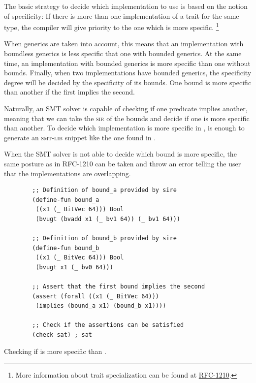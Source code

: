 The basic strategy to decide which implementation to use is based on the notion
of specificity: If there is more than one implementation of a trait for the
same type, the compiler will give priority to the one which is more specific.
\footnote{More information about trait specialization can be found at
\href{https://github.com/rust-lang/rfcs/blob/master/text/1210-impl-specialization.md}{RFC-1210}.}

When generics are taken into account, this means that an implementation with
boundless generics is less specific that one with bounded generics. At the same
time, an implementation with bounded generics is more specific than one without
bounds. Finally, when two implementations have bounded generics, the
specificity degree will be decided by the specificity of its bounds. One bound
is more specific than another if the first implies the second.

Naturally, an SMT solver is capable of checking if one predicate implies
another, meaning that we can take the \textsc{sir} of the bounds and decide if
one is more specific than another. To decide which implementation is more
specific in , is enough to generate an
\textsc{smt-lib} snippet like the one found in .

When the SMT solver is not able to decide which bound is more specific, the
same posture as in RFC-1210 can be taken and throw an error telling the user
that the implementations are overlapping.

\begin{listing}[h]
	\begin{verbatim}
        ;; Definition of bound_a provided by sire
        (define-fun bound_a
         ((x1 (_ BitVec 64))) Bool 
         (bvugt (bvadd x1 (_ bv1 64)) (_ bv1 64)))

        ;; Definition of bound_b provided by sire
        (define-fun bound_b 
         ((x1 (_ BitVec 64))) Bool 
         (bvugt x1 (_ bv0 64)))

        ;; Assert that the first bound implies the second
        (assert (forall ((x1 (_ BitVec 64))) 
         (implies (bound_a x1) (bound_b x1))))

        ;; Check if the assertions can be satisfied
        (check-sat) ; sat
	\end{verbatim}
    \caption{Checking if  is more specific than .}
  \label{lst:trait_spec_smt}
\end{listing}
